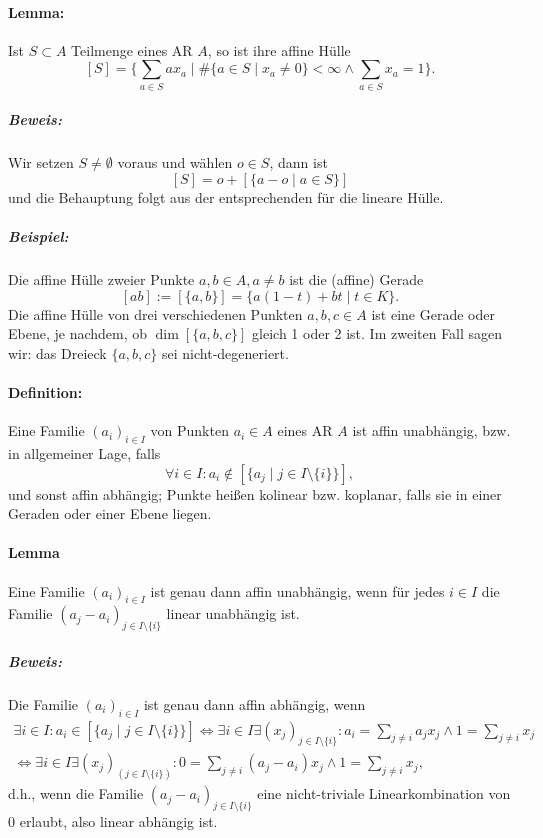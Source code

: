 \paragraph{Lemma: }
	\begin{Lemma}{}
		Ist $ S\subset A $ Teilmenge eines AR $ A $, so ist ihre affine Hülle
		\[ [S] = \{\sum_{a\in S}ax_a\mid \#\{a\in S\mid x_a\neq 0\}<\infty \land \sum_{a\in S}x_a = 1 \}. \]
	\end{Lemma}
\subparagraph{Beweis: }
	Wir setzen $ S\neq \emptyset $ voraus und wählen $ o\in S $, dann ist
	\[ [S] = o+[\{a-o\mid a\in S\}] \]
	und die Behauptung folgt aus der entsprechenden für die lineare Hülle.
\subparagraph{Beispiel: }
	Die affine Hülle zweier Punkte $ a,b\in A, a\neq b $ ist die (affine) Gerade
	\[ [ab] := [\{a,b\}] = \{a(1-t)+bt\mid t\in K\}. \]
	Die affine Hülle von drei verschiedenen Punkten $ a,b,c\in A $ ist eine Gerade oder Ebene, je nachdem, ob $ \dim[\{a,b,c\}] $ gleich 1 oder 2 ist. Im zweiten Fall sagen wir: das Dreieck $ \{a,b,c\} $ sei nicht-degeneriert.
\paragraph{Definition: }
	\begin{Definition}
		Eine Familie $ (a_i)_{i\in I} $ von Punkten $ a_i\in A $ eines AR $ A $ ist affin unabhängig, bzw. in allgemeiner Lage, falls
		\[ \forall i\in I:a_i\notin [\{a_j\mid j\in I\setminus \{i\}\}], \]
		und sonst affin abhängig; Punkte heißen kolinear bzw. koplanar, falls sie in einer Geraden oder einer Ebene liegen.
	\end{Definition}
\paragraph{Lemma}
	\begin{Lemma}
		Eine Familie $ (a_i)_{i\in I} $ ist genau dann affin unabhängig, wenn für jedes $ i\in I $ die Familie $ (a_j-a_i)_{j\in I\setminus \{i\}} $ linear unabhängig ist.
	\end{Lemma}
\subparagraph{Beweis: }
	Die Familie $ (a_i)_{i\in I} $ ist genau dann affin abhängig, wenn
	\begin{gather*}
		\exists i\in I:a_i\in [\{a_j\mid j\in I\setminus \{i\}\}] \Leftrightarrow \exists i\in I\exists(x_j)_{j\in I\setminus \{i\}}:a_i=\sum_{j\neq i}a_jx_j\land 1=\sum_{j\neq i}x_j\\
		\Leftrightarrow \exists i\in I\exists (x_j)_(j\in I\setminus \{i\}):0=\sum_{j\neq i}(a_j-a_i)x_j \land 1=\sum_{j\neq i}x_j,
	\end{gather*}
	d.h., wenn die Familie $ (a_j-a_i)_{j\in I\setminus \{i\}} $ eine nicht-triviale Linearkombination von 0 erlaubt, also linear abhängig ist.
